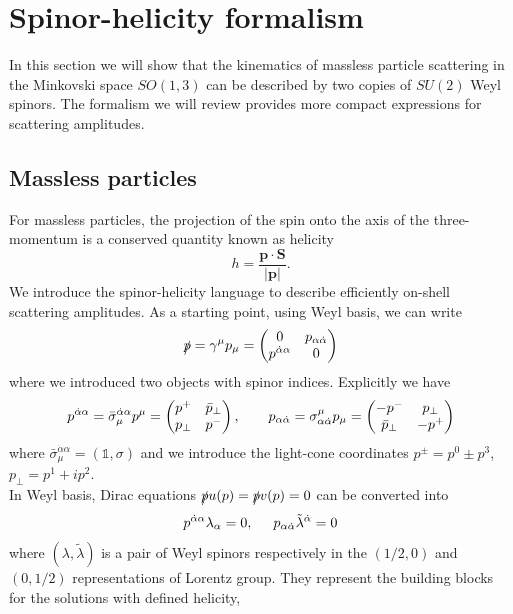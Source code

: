 \section{Spinor-helicity formalism}
In this section we will show that the kinematics of massless particle scattering in the Minkovski space $SO(1,3)$ can be described by two copies of $SU(2)$ Weyl spinors. The formalism we will review provides more compact expressions for scattering amplitudes.
\subsection{Massless particles} 
For massless particles, the projection of the spin onto the axis of the three-momentum is a conserved quantity known as helicity
$$
	h=\frac{\mathbf{p}\cdot \mathbf{S}}{|\mathbf{p}|}.
$$
We introduce the spinor-helicity language to describe efficiently on-shell scattering amplitudes. As a starting point, using Weyl basis, we can write
$$
	\slashed p =\gamma^\mu p_\mu=\begin{pmatrix}
		0 & p_{\alpha \dot\alpha } \\
		p^{\dot \alpha \alpha} & 0
	\end{pmatrix}
$$
where we introduced two objects with spinor indices. Explicitly we have
$$
	p^{\dot\alpha \alpha}=\bar \sigma^{\dot\alpha \alpha}_\mu p^\mu=
	\begin{pmatrix}
		p^{+} & \bar p_\perp \\
		p_\perp & p^{-}
	\end{pmatrix}, \hspace{0.7cm} p_{\alpha \dot\alpha}=\sigma_{\alpha \dot\alpha}^\mu p_\mu=
	\begin{pmatrix}
		-p^{-} & p_\perp \\
		\bar p_\perp & -p^{+}
	\end{pmatrix}
$$
where $\bar \sigma^{\dot\alpha \alpha}_\mu=(\mathbb{1},\sigma)$ and we introduce the light-cone coordinates $p^{\pm}=p^0\pm p^3$, $p_\perp=p^1+ip^2$.\\
In Weyl basis, Dirac equations $\slashed p u(p)=\slashed p v(p)=0$ can be converted into
\begin{align}
	p^{\dot \alpha \alpha} \lambda_{\alpha}=0, \hspace{0.5cm} p_{\alpha \dot\alpha} \tilde \lambda^{\dot \alpha}=0
	\label{Direq}
\end{align}
where $(\lambda, \tilde\lambda)$ is a pair of Weyl spinors respectively in the $(1/2,0)$ and $(0,1/2)$ representations of Lorentz group. They represent the building blocks for the solutions with defined helicity,

